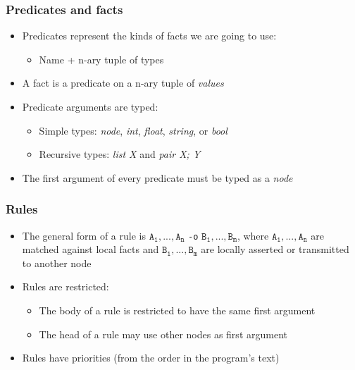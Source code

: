 \documentclass{beamer}
\begin{document}
\begin{frame}[fragile]
   \frametitle{Predicates and facts}
   \begin{itemize}
      \item Predicates represent the kinds of facts we are going to use:
      \begin{itemize}
         \item Name + n-ary tuple of types
      \end{itemize}
      \item A fact is a predicate on a n-ary tuple of \emph{values}
      \item Predicate arguments are typed:
      \begin{itemize}
         \item Simple types: \emph{node}, \emph{int}, \emph{float}, \emph{string}, or \emph{bool}
         \item Recursive types: \emph{list X} and \emph{pair X; Y}
      \end{itemize}
      \item The first argument of every predicate must be typed as a \emph{node}
   \end{itemize}
\end{frame}

\begin{frame}[fragile]
   \frametitle{Rules}
   \begin{itemize}
      \item The general form of a rule is $\mathtt{A_1},...,\mathtt{A_n}$ \texttt{-o} $\mathtt{B_1},...,\mathtt{B_m}$, where $\mathtt{A_1},...,\mathtt{A_n}$ are matched against local facts and $\mathtt{B_1},...,\mathtt{B_m}$ are locally asserted or transmitted to another node
      \item Rules are restricted:
      \begin{itemize}
         \item The body of a rule is restricted to have the same first argument
         \item The head of a rule may use other nodes as first argument
      \end{itemize}
      \item Rules have priorities (from the order in the program's text)
   \end{itemize}
\end{frame}
\end{document}
